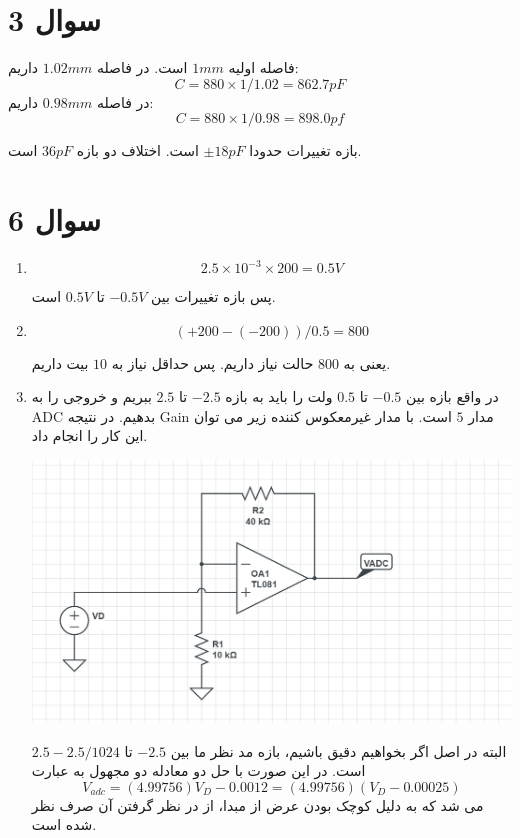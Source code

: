 \documentclass[12pt]{article}
\begin{document}
\KashidaOff


\section*{سوال 3}

فاصله اولیه $1mm$ است. در فاصله $1.02mm$ داریم:
$$C = 880 \times 1/1.02 = 862.7 pF$$
در فاصله $0.98mm$ داریم:
$$C = 880 \times 1/0.98 = 898.0 pf$$

بازه تغییرات حدودا $\pm 18pF$ است. اختلاف دو بازه $36 pF$ است.

\section*{سوال 6}


\begin{enumerate}
	\item 
	
	
	$$2.5 \times 10^{-3} \times 200 = 0.5V$$
	
	پس بازه تغییرات بین $-0.5V$ تا $0.5V$ است.

\item

$$(+ 200 - (-200)) / 0.5 =800$$

یعنی به $800$ حالت نیاز داریم. پس حداقل نیاز به $10$ بیت داریم.


\item

در واقع بازه بین $-0.5$ تا $0.5$ ولت را باید به بازه $-2.5$ تا $2.5$ ببریم و خروجی را به ADC بدهیم. در نتیجه Gain مدار $5$ است. با مدار غیرمعکوس کننده زیر می توان این کار را انجام داد.

\begin{center}
	\includegraphics[width = 1.0 \textwidth]{images/1.png}
\end{center}	

البته در اصل اگر بخواهیم دقیق باشیم، بازه مد نظر ما بین $-2.5$ تا $2.5 -2.5/1024$ است. در این صورت با حل دو معادله دو مجهول به عبارت
$$V_{adc} = (4.99756) V_{D} - 0.0012 =(4.99756)(V_{D} - 0.00025) $$
می شد که به دلیل کوچک بودن عرض از مبدا، از در نظر گرفتن آن صرف نظر شده است.
\end{enumerate}
\end{document}
